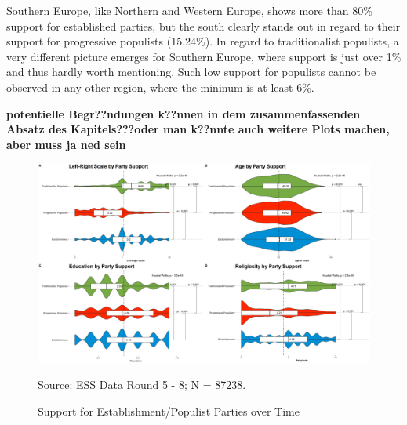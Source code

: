 \documentclass[]{article}
\begin{document}
Southern Europe, like Northern and Western Europe, shows more than 80\%
support for established parties, but the south clearly stands out in
regard to their support for progressive populists (15.24\%). In regard
to traditionalist populists, a very different picture emerges for
Southern Europe, where support is just over 1\% and thus hardly worth
mentioning. Such low support for populists cannot be observed in any
other region, where the mininum is at least 6\%.

\textbf{potentielle Begr??ndungen k??nnen in dem zusammenfassenden
Absatz des Kapitels???oder man k??nnte auch weitere Plots machen, aber
muss ja ned sein}

\begin{figure}[!h]
    \caption{Support for Establishment/Populist Parties over Time}
    \label{plot2by2}
    \includegraphics[width=\textwidth]{images/plot2by2.png}
    \flushright
    {\scriptsize Source: ESS Data Round 5 - 8; N = 87238. \par}
\end{figure}
\end{document}
